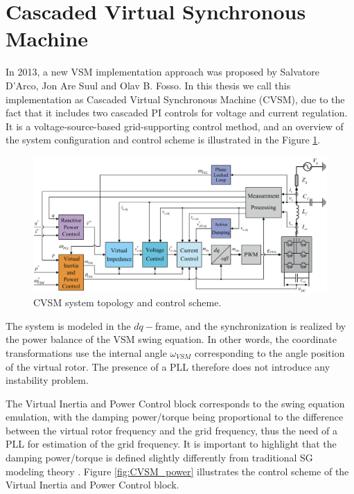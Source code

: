 \section{Cascaded Virtual Synchronous Machine}\label{sec:CSVSM}

In 2013, a new VSM implementation approach was proposed by Salvatore D'Arco, Jon
Are Suul and Olav B. Fosso\cite{darco2013control,darco2014small,darco2015vsm}.
In this thesis we call this implementation as Cascaded Virtual Synchronous
Machine (CVSM), due to the fact that it includes two cascaded PI controls for
voltage and current regulation. It is a voltage-source-based grid-supporting
control method, and an overview of the system configuration and control scheme
is illustrated in the Figure \ref{fig:CVSM}.

\begin{figure}[ht!]
    \centering
    \includegraphics[width=12cm]{images/CVSM.png}
    \caption{CVSM system topology and control scheme\cite{darco2015vsm}.}
    \label{fig:CVSM}
\end{figure}

The system is modeled in the $dq-$frame, and the synchronization is realized by
the power balance of the VSM swing equation. In other words, the coordinate
transformations use the internal angle $\omega_{VSM}$ corresponding to the angle
position of the virtual rotor. The presence of a PLL therefore does not
introduce any instability problem.

The Virtual Inertia and Power Control block corresponds to the swing equation
emulation, with the damping power/torque being proportional to the difference
between  the virtual rotor frequency and the grid frequency, thus the need of a
PLL for estimation of the grid frequency. It is important to highlight that the 
damping power/torque is defined slightly differently from traditional SG
modeling theory \cite{sauer2017power, kundur2022power}. Figure
\ref{fig:CVSM_power} illustrates the control scheme of the Virtual Inertia and
Power Control block.


